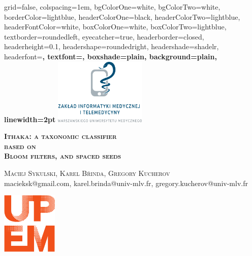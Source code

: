 \documentclass[portrait,final,a0paper,fontscale=0.277]{baposter}
\begin{document}
\begin{poster}%
  {
  grid=false,
  colspacing=1em,
  bgColorOne=white,
  bgColorTwo=white,
  borderColor=lightblue,
  headerColorOne=black,
  headerColorTwo=lightblue,
  headerFontColor=white,
  boxColorOne=white,
  boxColorTwo=lightblue,
  textborder=roundedleft,
  eyecatcher=true,
  headerborder=closed,
  headerheight=0.1\textheight,
  headershape=roundedright,
  headershade=shadelr,
  headerfont=\Large\bf\textsc, %
  textfont={\setlength{\parindent}{1.5em}},
  boxshade=plain,
  background=plain,
  linewidth=2pt
  }
  {%
  \includegraphics[height=8.5em]{images/zimt_logo_square_RGB-1024x738.png}
  } 
  {\begingroup
      \bf\textsc{Ithaka: a taxonomic classifier \\
      {\vspace{-0.2em}  based on \\} 
      \vspace{0.0em}	
            Bloom filters, and spaced seeds}
   \endgroup
   \vspace{0.06em}}
  {\textsc{Maciej Sykulski, Karel B{\v r}inda, Gregory Kucherov}\\
   {\small macieksk@gmail.com, karel.brinda@univ-mlv.fr, gregory.kucherov@univ-mlv.fr}
   }   
  {%
    
    \includegraphics[height=8.0em]{images/UPEM_LOGO_SIGNALETIQUE_SMALL.pdf}
  }


\end{poster}
\end{document}
